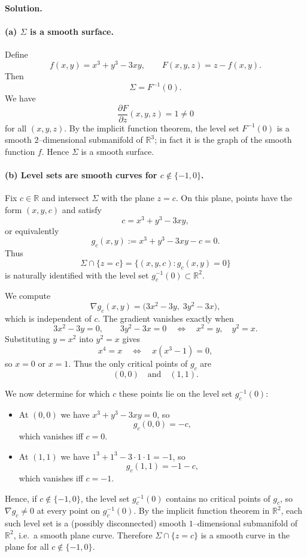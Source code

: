 \documentclass[12pt,a4paper]{article}
\theoremstyle{plain}
\theoremstyle{definition}      %
\begin{document}
	
	\textbf{Solution.}
	
	\paragraph{(a) $\Sigma$ is a smooth surface.}
	Define
	\[
	f(x,y) = x^3 + y^3 - 3xy, \qquad
	F(x,y,z) = z - f(x,y).
	\]
	Then
	\[
	\Sigma = F^{-1}(0).
	\]
	We have
	\[
	\frac{\partial F}{\partial z}(x,y,z) = 1 \neq 0
	\]
	for all $(x,y,z)$.
	By the implicit function theorem, the level set $F^{-1}(0)$ is a smooth
	$2$--dimensional submanifold of $\mathbb{R}^3$; in fact it is the graph of the
	smooth function $f$.  Hence $\Sigma$ is a smooth surface.
	
	\paragraph{(b) Level sets are smooth curves for $c\notin\{-1,0\}$.}
	Fix $c\in\mathbb{R}$ and intersect $\Sigma$ with the plane $z=c$.
	On this plane, points have the form $(x,y,c)$ and satisfy
	\[
	c = x^3 + y^3 - 3xy,
	\]
	or equivalently
	\[
	g_c(x,y) := x^3 + y^3 - 3xy - c = 0.
	\]
	Thus
	\[
	\Sigma \cap \{z=c\}
	= \{(x,y,c) : g_c(x,y)=0\}
	\]
	is naturally identified with the level set $g_c^{-1}(0)\subset\mathbb{R}^2$.
	
	We compute
	\[
	\nabla g_c(x,y) = \bigl(3x^2 - 3y,\; 3y^2 - 3x\bigr),
	\]
	which is independent of $c$.
	The gradient vanishes exactly when
	\[
	3x^2 - 3y = 0, \qquad 3y^2 - 3x = 0
	\quad\Longleftrightarrow\quad
	x^2 = y, \quad y^2 = x.
	\]
	Substituting $y=x^2$ into $y^2=x$ gives
	\[
	x^4 = x \quad\Longleftrightarrow\quad x(x^3-1)=0,
	\]
	so $x=0$ or $x=1$.  Thus the only critical points of $g_c$ are
	\[
	(0,0) \quad\text{and}\quad (1,1).
	\]
	
	We now determine for which $c$ these points lie on the level set $g_c^{-1}(0)$:
	
	\begin{itemize}
		\item At $(0,0)$ we have $x^3 + y^3 - 3xy = 0$, so
		\[
		g_c(0,0) = -c,
		\]
		which vanishes iff $c=0$.
		\item At $(1,1)$ we have $1^3+1^3-3\cdot1\cdot1 = -1$, so
		\[
		g_c(1,1) = -1 - c,
		\]
		which vanishes iff $c=-1$.
	\end{itemize}
	
	Hence, if $c\notin\{-1,0\}$, the level set $g_c^{-1}(0)$ contains no critical
	points of $g_c$, so $\nabla g_c\neq 0$ at every point on $g_c^{-1}(0)$.
	By the implicit function theorem in $\mathbb{R}^2$, each such level set is a
	(possibly disconnected) smooth $1$--dimensional submanifold of
	$\mathbb{R}^2$, i.e.\ a smooth plane curve.  Therefore
	$\Sigma\cap\{z=c\}$ is a smooth curve in the plane for all
	$c\notin\{-1,0\}$.
	
\end{document}
